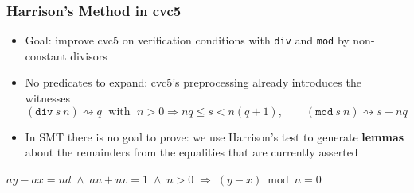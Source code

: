 \documentclass[usepdftitle=false,aspectratio=169,usenames,dvipsnames]{beamer}
\newcommand\pvitem{\pause\vfill\item}
\begin{document}
\begin{frame}
  \frametitle{Harrison's Method in cvc5}
  \begin{itemize}
    \item Goal: improve cvc5 on verification conditions with \texttt{div} and \texttt{mod} by non-constant divisors
    \pvitem No predicates to expand: cvc5's preprocessing already introduces the witnesses
      \abovedisplayskip=4pt \belowdisplayskip=4pt
      \[ (\mathtt{div}\ s\ n) \rightsquigarrow q \;\text{ with }\; n > 0 \Rightarrow nq \le s < n(q + 1), \qquad (\mathtt{mod}\ s\ n) \rightsquigarrow s - nq \]
    \pvitem In SMT there is no goal to prove: we use Harrison's test to generate \textbf{lemmas} about the remainders from the equalities that are currently asserted
  \end{itemize}
  \pause
  \vfill
  \begin{tcolorbox}[colback=green!5,colframe=green!40!black,title=Example,top=1pt,bottom=1pt]
    \centering
    $ay - ax = nd \;\wedge\; au + nv = 1 \;\wedge\; n > 0 \;\Rightarrow\; (y - x) \bmod n = 0$
  \end{tcolorbox}
\end{frame}
\end{document}
